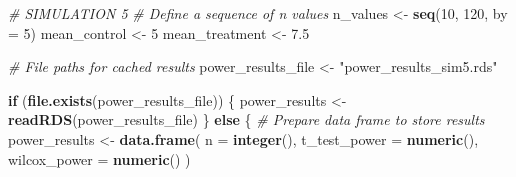 \documentclass[
]{article}
\newenvironment{Shaded}{\begin{snugshade}}{\end{snugshade}}
\newcommand{\AttributeTok}[1]{\textcolor[rgb]{0.13,0.29,0.53}{#1}}
\newcommand{\CommentTok}[1]{\textcolor[rgb]{0.56,0.35,0.01}{\textit{#1}}}
\newcommand{\ControlFlowTok}[1]{\textcolor[rgb]{0.13,0.29,0.53}{\textbf{#1}}}
\newcommand{\DecValTok}[1]{\textcolor[rgb]{0.00,0.00,0.81}{#1}}
\newcommand{\FloatTok}[1]{\textcolor[rgb]{0.00,0.00,0.81}{#1}}
\newcommand{\FunctionTok}[1]{\textcolor[rgb]{0.13,0.29,0.53}{\textbf{#1}}}
\newcommand{\NormalTok}[1]{#1}
\newcommand{\OtherTok}[1]{\textcolor[rgb]{0.56,0.35,0.01}{#1}}
\newcommand{\StringTok}[1]{\textcolor[rgb]{0.31,0.60,0.02}{#1}}
\begin{document}
\begin{Shaded}
\begin{Highlighting}[]
\CommentTok{\# SIMULATION 5}
\CommentTok{\# Define a sequence of n values}
\NormalTok{n\_values }\OtherTok{\textless{}{-}} \FunctionTok{seq}\NormalTok{(}\DecValTok{10}\NormalTok{, }\DecValTok{120}\NormalTok{, }\AttributeTok{by =} \DecValTok{5}\NormalTok{)}
\NormalTok{mean\_control }\OtherTok{\textless{}{-}} \DecValTok{5}
\NormalTok{mean\_treatment }\OtherTok{\textless{}{-}} \FloatTok{7.5}

\CommentTok{\# File paths for cached results}
\NormalTok{power\_results\_file }\OtherTok{\textless{}{-}} \StringTok{"power\_results\_sim5.rds"}

\ControlFlowTok{if}\NormalTok{ (}\FunctionTok{file.exists}\NormalTok{(power\_results\_file)) \{}
\NormalTok{  power\_results }\OtherTok{\textless{}{-}} \FunctionTok{readRDS}\NormalTok{(power\_results\_file)}
\NormalTok{\} }\ControlFlowTok{else}\NormalTok{ \{}
  \CommentTok{\# Prepare data frame to store results}
\NormalTok{  power\_results }\OtherTok{\textless{}{-}} \FunctionTok{data.frame}\NormalTok{(}
    \AttributeTok{n =} \FunctionTok{integer}\NormalTok{(),}
    \AttributeTok{t\_test\_power =} \FunctionTok{numeric}\NormalTok{(),}
    \AttributeTok{wilcox\_power =} \FunctionTok{numeric}\NormalTok{()}
\NormalTok{  )}


\end{Highlighting}
\end{Shaded}
\end{document}
